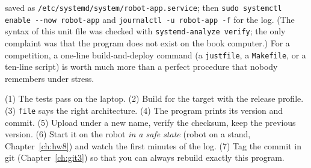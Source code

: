 saved as \verb!/etc/systemd/system/robot-app.service!; then \verb!sudo systemctl enable --now robot-app! and \verb!journalctl -u robot-app -f! for the log. (The syntax of this unit file was checked with \verb!systemd-analyze verify!; the only complaint was that the program does not exist on the book computer.) For a competition, a one-line build-and-deploy command (a \verb!justfile!, a \verb!Makefile!, or a ten-line script) is worth much more than a perfect procedure that nobody remembers under stress.

\begin{aibox}
(1) The tests pass on the laptop. (2) Build for the target with the release profile. (3) \verb!file! says the right architecture. (4) The program prints its version and commit. (5) Upload under a new name, verify the checksum, keep the previous version. (6) Start it on the robot \emph{in a safe state} (robot on a stand, Chapter~\ref{ch:hw8}) and watch the first minutes of the log. (7) Tag the commit in git (Chapter~\ref{ch:git3}) so that you can always rebuild exactly this program.
\end{aibox}

